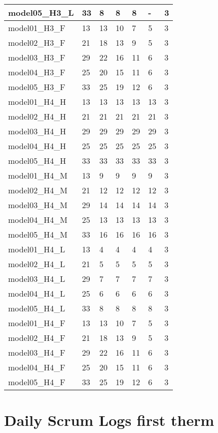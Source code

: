 \begin{longtable}{|l|l|l|l|l|l|l|}
model05\_H3\_L & 33 & 8 & 8 & 8 & - & 3 \\ \hline
model01\_H3\_F & 13 & 13 & 10 & 7 & 5 & 3 \\ \hline
model02\_H3\_F & 21 & 18 & 13 & 9 & 5 & 3 \\ \hline
model03\_H3\_F & 29 & 22 & 16 & 11 & 6 & 3 \\ \hline
model04\_H3\_F & 25 & 20 & 15 & 11 & 6 & 3 \\ \hline
model05\_H3\_F & 33 & 25 & 19 & 12 & 6 & 3 \\ \hline
model01\_H4\_H & 13 & 13 & 13 & 13 & 13 & 3 \\ \hline
model02\_H4\_H & 21 & 21 & 21 & 21 & 21 & 3 \\ \hline
model03\_H4\_H & 29 & 29 & 29 & 29 & 29 & 3 \\ \hline
model04\_H4\_H & 25 & 25 & 25 & 25 & 25 & 3 \\ \hline
model05\_H4\_H & 33 & 33 & 33 & 33 & 33 & 3 \\ \hline
model01\_H4\_M & 13 & 9 & 9 & 9 & 9 & 3 \\ \hline
model02\_H4\_M & 21 & 12 & 12 & 12 & 12 & 3 \\ \hline
model03\_H4\_M & 29 & 14 & 14 & 14 & 14 & 3 \\ \hline
model04\_H4\_M & 25 & 13 & 13 & 13 & 13 & 3 \\ \hline
model05\_H4\_M & 33 & 16 & 16 & 16 & 16 & 3 \\ \hline
model01\_H4\_L & 13 & 4 & 4 & 4 & 4 & 3 \\ \hline
model02\_H4\_L & 21 & 5 & 5 & 5 & 5 & 3 \\ \hline
model03\_H4\_L & 29 & 7 & 7 & 7 & 7 & 3 \\ \hline
model04\_H4\_L & 25 & 6 & 6 & 6 & 6 & 3 \\ \hline
model05\_H4\_L & 33 & 8 & 8 & 8 & 8 & 3 \\ \hline
model01\_H4\_F & 13 & 13 & 10 & 7 & 5 & 3 \\ \hline
model02\_H4\_F & 21 & 18 & 13 & 9 & 5 & 3 \\ \hline
model03\_H4\_F & 29 & 22 & 16 & 11 & 6 & 3 \\ \hline
model04\_H4\_F & 25 & 20 & 15 & 11 & 6 & 3 \\ \hline
model05\_H4\_F & 33 & 25 & 19 & 12 & 6 & 3 \\ \hline
\end{longtable}

\newpage
\section{Daily Scrum Logs first therm}
\label{section:appendix_b}











